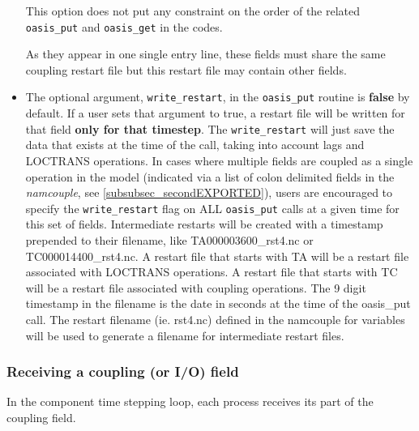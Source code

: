 \begin{itemize}
This option does not put any constraint
on the order of the related {\tt oasis\_put} and {\tt oasis\_get} in the codes.

As they appear in one single entry line, these fields must share the same coupling restart file 
but this restart file may contain other fields.

\item The optional argument, {\tt write\_restart}, in the {\tt oasis\_put} routine is {\bf false} by default. 
If a user sets that argument to true, a restart file will be written for that field {\bf only for that timestep}. The {\tt write\_restart} 
will just save the data that exists at the time of the call, taking into account lags and LOCTRANS operations. In 
cases where multiple fields are coupled as a single operation in the model (indicated via a list of colon delimited 
fields in the {\it namcouple}, see \ref{subsubsec_secondEXPORTED}), users are encouraged to specify 
the {\tt write\_restart} flag on ALL {\tt oasis\_put} calls at a given
time for this set of fields.
Intermediate restarts will be created with a timestamp prepended to
their filename, like TA000003600\_rst4.nc or TC000014400\_rst4.nc. 
A restart file that starts with TA will be a restart file associated
with LOCTRANS operations. A restart 
file that starts with TC will be a restart file associated with
coupling operations. The 9 digit timestamp in 
the filename is the date in seconds at the time of the oasis\_put
call. The restart filename (ie. rst4.nc) 
defined in the namcouple for variables will be used to generate a filename for intermediate restart files.
\end{itemize}

\subsubsection{Receiving a coupling (or I/O) field}

In the component time stepping loop, each process receives its part of the
coupling field.

